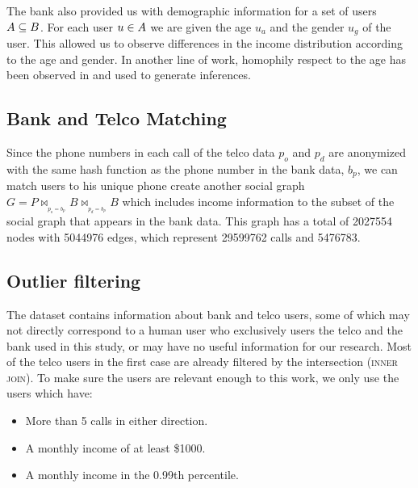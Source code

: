 The bank also provided us with demographic information for a set of users \( \mathlarger{A} \subseteq \mathlarger{B} \). For each user \( u \in \mathlarger{A} \) we are given  the age \( u_a \) and the gender \( u_g \) of the user. This allowed us to observe differences in the income distribution according to the age and gender. In another line of work, homophily respect to the age has been observed in \cite{brea2014} and used to generate inferences.


\subsection{Bank and Telco Matching}

Since the phone numbers in each call of the telco data $ p_o $ and $ p_d $ are anonymized with the same hash function as the phone number in the bank data, $ b_p $, we can match users to his unique phone create another social graph $ G = P \bowtie_{_{p_o = b_p}} B \bowtie_{_{p_d = b_p}} B $ which includes income information to the subset of the social graph that appears in the bank data.
This graph has a total of \num{2027554} nodes with \num{5044976} edges, which represent \num{29599762} calls and \num{5476783}.

\subsection{Outlier filtering}

The dataset contains information about bank and telco users, some of which may not directly correspond to a human user who exclusively users the telco and the bank used in this study, or may have no useful information for our research. Most of the telco users in the first case are already filtered by the intersection (\textsc{inner join}). To make sure the users are relevant enough to this work, we only use the users which have:

\begin{itemize}
	\item More than 5 calls in either direction.
	\item A monthly income of at least \$\num{1000}.
	\item A monthly income in the \num{0.99}th percentile.
\end{itemize}
